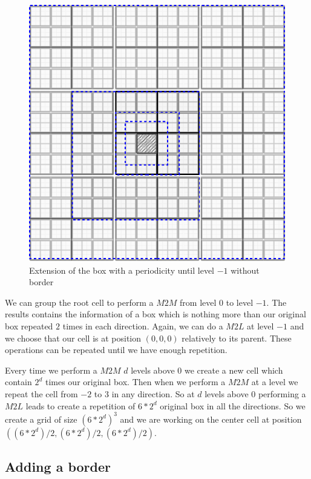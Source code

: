 \documentclass[12pt]{article} %
\begin{document}
\begin{figure}[h]
\centering
\includegraphics[scale=0.45]{Images/PeriodicL-1}
\caption{Extension of the box with a periodicity until level $-1$ without border}
\end{figure}

We can group the root cell to perform a $M2M$ from level $0$ to level $-1$.
The results contains the information of a box which is nothing more than our original box repeated $2$ times in each direction.
Again, we can do a $M2L$ at level $-1$ and we choose that our cell is at position $(0,0,0)$ relatively to its parent.
These operations can be repeated until we have enough repetition.

Every time we perform a $M2M$ $d$ levels above $0$ we create a new cell which contain $2^d$ times our original box.
Then when we perform a $M2M$ at a level we repeat the cell from $-2$ to $3$ in any direction.
So at $d$ levels above $0$ performing a $M2L$ leads to create a repetition of $6*2^d$ original box in all the directions.
So we create a grid of size $(6*2^d)^3$ and we are working on the center cell at position $((6*2^d)/2,(6*2^d)/2,(6*2^d)/2)$.


\subsection{Adding a border}
\end{document}
